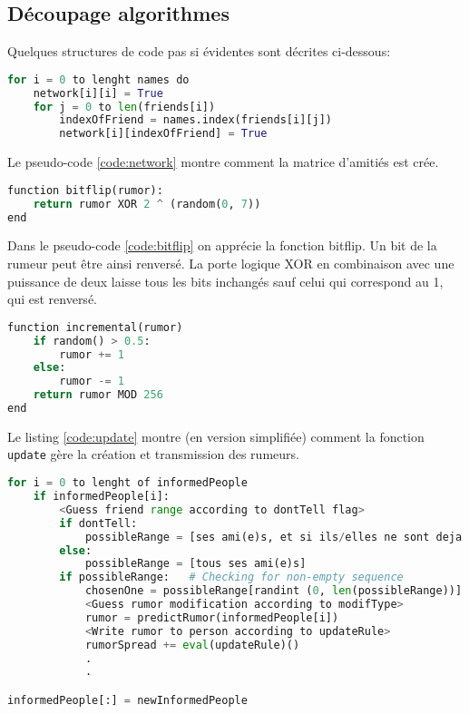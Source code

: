 \documentclass[11pt,a4paper]{article}
\begin{document}
\subsection{Découpage algorithmes}
\label{section:algos}

Quelques structures de code pas si évidentes sont décrites ci-dessous:


\begin{lstlisting}[label={code:network},language=Python, caption=Bout de code de la fonction loadNetwork]
for i = 0 to lenght names do
    network[i][i] = True
    for j = 0 to len(friends[i])
        indexOfFriend = names.index(friends[i][j])
        network[i][indexOfFriend] = True
\end{lstlisting}

Le pseudo-code \ref{code:network} montre comment la matrice d'amitiés est crée.

\begin{lstlisting}[label={code:bitflip},language=Python, caption=Fonction bitflip]
function bitflip(rumor):
    return rumor XOR 2 ^ (random(0, 7))
end
\end{lstlisting}

Dans le pseudo-code \ref{code:bitflip} on apprécie la fonction bitflip. Un bit de la rumeur peut être ainsi renversé. La porte logique XOR en combinaison avec une puissance de deux laisse tous les bits inchangés sauf celui qui correspond au 1, qui est renversé.

\begin{lstlisting}[label={code:incremental},language=Python, caption=Fonction incremental]
function incremental(rumor)
    if random() > 0.5:
        rumor += 1
    else:
        rumor -= 1
    return rumor MOD 256
end
\end{lstlisting}

Le listing \ref{code:update} montre (en version simplifiée) comment la fonction \texttt{update} gère la création et transmission des rumeurs.

\begin{lstlisting}[label={code:update},language=Python, caption=Fonction update]
for i = 0 to lenght of informedPeople
    if informedPeople[i]:
        <Guess friend range according to dontTell flag>
        if dontTell:
            possibleRange = [ses ami(e)s, et si ils/elles ne sont deja informe(e)s]
        else:
            possibleRange = [tous ses ami(e)s]
        if possibleRange:   # Checking for non-empty sequence
            chosenOne = possibleRange[randint (0, len(possibleRange))]
            <Guess rumor modification according to modifType>
            rumor = predictRumor(informedPeople[i])
            <Write rumor to person according to updateRule>
            rumorSpread += eval(updateRule)()
            .
            .

informedPeople[:] = newInformedPeople
\end{lstlisting}
\end{document}
